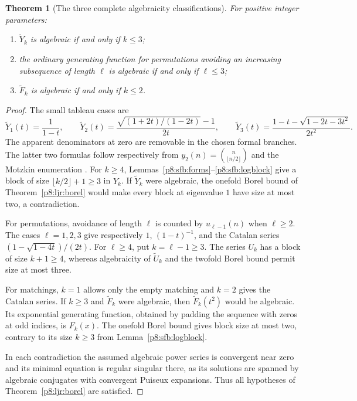 \documentclass[11pt,a4paper]{article}
\newtheorem{theorem}{Theorem}[section]
\theoremstyle{definition}
\theoremstyle{remark}
\numberwithin{equation}{section}
\begin{document}
\begin{theorem}[The three complete algebraicity classifications]
\label{p8:sfb:algebraicity}
For positive integer parameters:
\begin{enumerate}
\item $\widetilde Y_k$ is algebraic if and only if $k\le3$;
\item the ordinary generating function for permutations avoiding
      an increasing subsequence of length $\ell$ is algebraic
      if and only if $\ell\le3$;
\item $\widetilde F_k$ is algebraic if and only if $k\le2$.
\end{enumerate}
\end{theorem}
\begin{proof}
The small tableau cases are
\[
 \widetilde Y_1(t)=\frac1{1-t},\qquad
 \widetilde Y_2(t)=\frac{\sqrt{(1+2t)/(1-2t)}-1}{2t},\qquad
 \widetilde Y_3(t)=\frac{1-t-\sqrt{1-2t-3t^2}}{2t^2}.
\]
The apparent denominators at zero are removable in the chosen
formal branches.  The latter two formulas follow respectively
from $y_2(n)=\binom n{\lfloor n/2\rfloor}$ and the Motzkin
enumeration \cite[equation (3)]{p8:SFB_Mishna}.
For $k\ge4$, Lemmas~\ref{p8:sfb:forms}--\ref{p8:sfb:logblock}
give a block of size $\lfloor k/2\rfloor+1\ge3$ in $Y_k$.
If $\widetilde Y_k$ were algebraic, the onefold Borel bound
of Theorem~\ref{p8:ljr:borel} would make every block at eigenvalue
$1$ have size at most two, a contradiction.

For permutations, avoidance of length $\ell$ is counted by
$u_{\ell-1}(n)$ when $\ell\ge2$.  The cases $\ell=1,2,3$
give respectively $1$, $(1-t)^{-1}$, and the Catalan series
$(1-\sqrt{1-4t})/(2t)$.  For $\ell\ge4$, put
$k=\ell-1\ge3$.  The series $U_k$ has a block of size
$k+1\ge4$, whereas algebraicity of $\widetilde U_k$ and
the twofold Borel bound permit size at most three.

For matchings, $k=1$ allows only the empty matching and
$k=2$ gives the Catalan series.  If $k\ge3$ and
$\widetilde F_k$ were algebraic, then
$\widetilde F_k(t^2)$ would be algebraic.  Its exponential
generating function, obtained by padding the sequence with
zeros at odd indices, is $F_k(x)$.
The onefold Borel bound gives block size at most two, contrary
to its size $k\ge3$ from Lemma~\ref{p8:sfb:logblock}.

In each contradiction the assumed algebraic power series is
convergent near zero and its minimal equation is regular
singular there, as its solutions are spanned by algebraic
conjugates with convergent Puiseux expansions.  Thus all
hypotheses of Theorem~\ref{p8:ljr:borel} are satisfied.
\end{proof}
\end{document}
